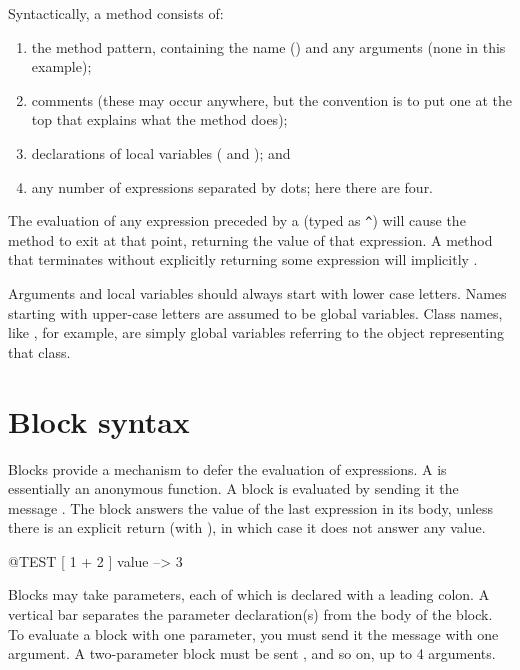 \documentclass[a4paper,10pt,twoside]{book}
\begin{document}
Syntactically, a method consists of:
\begin{enumerate}
  \item the method pattern, containing the name (\ie {}) and any arguments (none in this example);
  \item comments (these may occur anywhere, but the convention is to put one at the top that explains what the method does);
  \item declarations of local variables (\ie {} and ); and
  \item any number of expressions separated by dots; here there are four.
\end{enumerate}

The evaluation of any expression preceded by a \ct{^} (typed as \verb|^|) will cause the method to exit at that point, returning the value of that expression.
A method that terminates without explicitly returning some expression will implicitly  .

Arguments and local variables should always start with lower case letters.
Names starting with upper-case letters are assumed to be global variables.
Class names, like , for example, are simply global variables referring to the object representing that class.

\section{Block syntax}

Blocks provide a mechanism to defer the evaluation of expressions.
A  is essentially an anonymous function. A block is evaluated by sending it the message .
The block answers the value of the last expression in its body, unless there is an explicit return (with \ct{^}), in which case it does not answer any value.

\begin{code}{@TEST}
[ 1 + 2 ] value --> 3
\end{code}

Blocks may take parameters, each of which is declared with a leading colon.
A  vertical bar separates the parameter declaration(s) from the body of the block.
To evaluate a block with one parameter, you must send it the message  with one argument.
A two-parameter block must be sent , and so on, up to 4 arguments.
\end{document}
